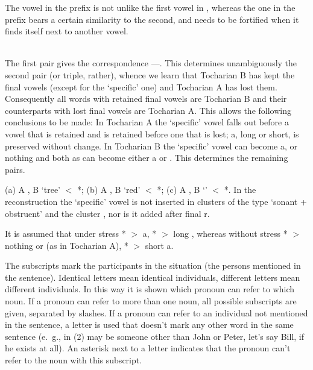 \comment
The vowel in the prefix  is not unlike the first vowel in ,
whereas the one in the prefix  bears a certain similarity to the second,
and needs to be fortified when it finds itself next to another vowel.

\editrans
{}

\solution
%
\assignment

\medskip
\tochdone
\medskip \\
%
The first pair gives the correspondence ---.
This determines unambiguously the second pair (or triple, rather), whence we learn
that Tocharian B has kept the final vowels (except for the `specific' one) and Tocharian A has lost them.
Consequently all words  with retained final vowels are Tocharian B
and their counterparts with lost final vowels are Tocharian A.
This allows the following conclusions to be made:
In Tocharian A the `specific' vowel falls out before a vowel that is retained
and is retained before one that is lost;
\wipa a, long or short, is preserved without change.
In Tocharian B the `specific' vowel can become \wipa a, \wipa{\schwa} or nothing
and both {\wipa a\/}s can become either \wipa a or \wipa{\A}.
This determines the remaining pairs.

\assignment
%
(a) A , B  `tree' $<$ *;
(b) A , B  `red' $<$ *;
(c) A , B  `' $<$ *.
%
In the reconstruction the `specific' vowel is not inserted in clusters of the type
`sonant + obstruent' and the cluster ,
nor is it added after final \wipa r.

\assignment
It is assumed that under stress *\wipa{\schwa} $>$ \wipa a, * $>$ long \wipa{\A},
whereas without stress *\wipa{\schwa} $>$ nothing or \wipa{\schwa} (as in Tocharian A),
* $>$ short \wipa a.

\solution
%
\assignment The subscripts mark the participants in the situation (the persons mentioned in the sentence).
Identical letters mean identical individuals, different letters mean different individuals.
In this way it is shown which pronoun can refer to which noun.
If a pronoun can refer to more than one noun,
all possible subscripts are given, separated by slashes.
If a pronoun can refer to an individual not mentioned in the sentence,
a letter is used that doesn't mark any other word in the same sentence
(e.~g.,  in (2) may be someone other than John or Peter, let's say Bill, if he exists at all).
An asterisk next to a letter indicates
that the pronoun can't refer to the noun with this subscript.

